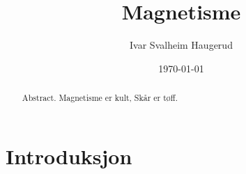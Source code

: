 \documentclass[%
 reprint,
 amsmath,amssymb,
 aps,
]{revtex4-1}
\begin{document}

\title{Magnetisme}%

\author{Ivar Svalheim Haugerud}

%

\date{\today}%

\begin{abstract}
Abstract. Magnetisme er kult, Skår er tøff.
\end{abstract}

\maketitle


\section{\label{sec:level1}Introduksjon}
\end{document}
